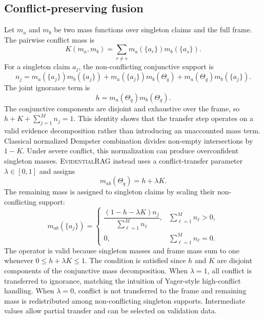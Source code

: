 \documentclass[preprint,12pt,authoryear,nopreprintline]{elsarticle}
\newcommand{\Frame}{\Theta}
\newcommand{\ERAG}{\textsc{EvidentialRAG}}
\begin{document}
\subsection{Conflict-preserving fusion}

Let $m_a$ and $m_b$ be two mass functions over singleton claims and the full frame. The pairwise conflict mass is
\begin{equation}
    K(m_a,m_b)=\sum_{r\neq s}m_a(\{a_r\})m_b(\{a_s\}).
    \label{eq:conflict_mass}
\end{equation}
For a singleton claim $a_j$, the non-conflicting conjunctive support is
\begin{equation}
    n_j=m_a(\{a_j\})m_b(\{a_j\}) + m_a(\{a_j\})m_b(\Frame_q) + m_a(\Frame_q)m_b(\{a_j\}).
    \label{eq:nonconf_support}
\end{equation}
The joint ignorance term is
\begin{equation}
    h=m_a(\Frame_q)m_b(\Frame_q).
    \label{eq:joint_ignorance}
\end{equation}
The conjunctive components are disjoint and exhaustive over the frame, so $h+K+\sum_{j=1}^{M}n_j=1$. This identity shows that the transfer step operates on a valid evidence decomposition rather than introducing an unaccounted mass term. Classical normalized Dempster combination divides non-empty intersections by $1-K$. Under severe conflict, this normalization can produce overconfident singleton masses. \ERAG{} instead uses a conflict-transfer parameter $\lambda\in[0,1]$ and assigns
\begin{equation}
    m_{ab}(\Frame_q)=h+\lambda K.
    \label{eq:frame_transfer}
\end{equation}
The remaining mass is assigned to singleton claims by scaling their non-conflicting support:
\begin{equation}
    m_{ab}(\{a_j\})=
    \begin{cases}
    \dfrac{(1-h-\lambda K)n_j}{\sum_{\ell=1}^{M} n_\ell}, & \sum_{\ell=1}^{M}n_\ell>0,\\[1.2em]
    0, & \sum_{\ell=1}^{M}n_\ell=0.
    \end{cases}
    \label{eq:singleton_transfer}
\end{equation}
The operator is valid because singleton masses and frame mass sum to one whenever $0\leq h+\lambda K\leq1$. The condition is satisfied since $h$ and $K$ are disjoint components of the conjunctive mass decomposition. When $\lambda=1$, all conflict is transferred to ignorance, matching the intuition of Yager-style high-conflict handling. When $\lambda=0$, conflict is not transferred to the frame and remaining mass is redistributed among non-conflicting singleton supports. Intermediate values allow partial transfer and can be selected on validation data.
\end{document}
